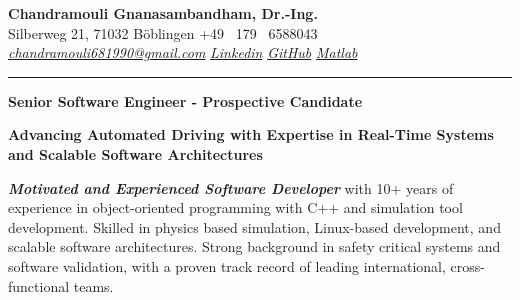 \documentclass[a4paper,10pt]{article}
\newcommand{\link}[1]{{\textit{#1}}}
\begin{document}
\thispagestyle{plain}

\begin{center}
    {\Large \textbf{Chandramouli Gnanasambandham, Dr.-Ing.}}\\ 
    
    \vspace{0.2cm}
    \small Silberweg 21, 71032 B\"oblingen \hfill  \bullet  \hfill  +49 \ 179 \ 6588043 \hfill \bullet  \hfill
    \textup{\href{mailto:chandramouli681990@gmail.com}{\link{chandramouli681990@gmail.com}}} \hfill \bullet \hfill
    \textup{\href{https://linkedin.com/in/ganasambandhamc}{\link{Linkedin}}} \hfill \bullet \hfill
    \textup{\href{https://github.com/chandramouli6890}{\link{GitHub}}} \hfill \bullet \hfill
    \textup{\href{https://de.mathworks.com/matlabcentral/profile/authors/4267772}{\link{Matlab}}}

    \vspace{-0.2cm}
    {\rule{\linewidth}{0.8pt}}

    \vspace{0.2cm}
    {\Large \textbf{Senior Software Engineer - Prospective Candidate}}
    
    \vspace{0.1cm}
    \colorbox{gray!40}{%
        \parbox{0.99\textwidth}{%
            \centering \textcolor{highlightcolor}{\textbf{Advancing Automated Driving with Expertise in Real-Time Systems and Scalable Software Architectures}}
        }%
    }
\end{center}


\noindent \textcolor{highlightcolor}{\textit{\textbf{Motivated and Experienced
Software Developer}}} with 10+ years of experience in object-oriented
programming with C++ and simulation tool development. Skilled in physics based
simulation, Linux-based development, and scalable software architectures.
Strong background in safety critical systems and software validation, with a
proven track record of leading international, cross-functional teams.
\end{document}
